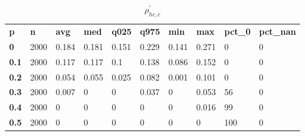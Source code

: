 \begin{table}[h]
 \centering 
\footnotesize
\caption{$\rho_{hc,c}^\prime $}
\label{tab:alphahcc}
\begin{tabular}[h]{| l l l l l l l l l l|
    } \hline
\textbf{ p} & \textbf{ n} & \textbf{ avg} & \textbf{ med} & \textbf{ q025} & \textbf{ q975} & \textbf{ min} & \textbf{ max} & \textbf{ pct\_0} & \textbf{ pct\_nan}
           \\
  \textbf{  0} & 2000 & 0.184 & 0.181 & 0.151 & 0.229 & 0.141 & 0.271 &   0 & 0
           \\
  \textbf{0.1} & 2000 & 0.117 & 0.117 &   0.1 & 0.138 & 0.086 & 0.152 &   0 & 0
           \\
  \textbf{0.2} & 2000 & 0.054 & 0.055 & 0.025 & 0.082 & 0.001 & 0.101 &   0 & 0
           \\
  \textbf{0.3} & 2000 & 0.007 &     0 &     0 & 0.037 &     0 & 0.053 &  56 & 0
           \\
  \textbf{0.4} & 2000 &     0 &     0 &     0 &     0 &     0 & 0.016 &  99 & 0
           \\
  \textbf{0.5} & 2000 &     0 &     0 &     0 &     0 &     0 &     0 & 100 & 0
           \\
 \hline \end{tabular}
 \end{table}
